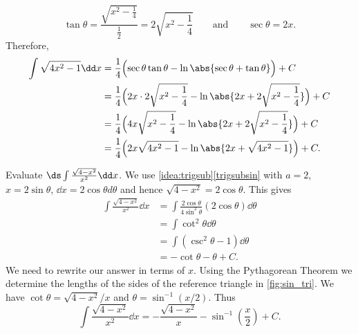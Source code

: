 \begin{example}
\[\tan \theta = \frac{\sqrt{x^2-\frac14}}{\frac12} = 2\sqrt{x^2-\frac14}\qquad \text{and}\qquad\sec\theta = 2x.\]
Therefore,
\begin{align*}
	\int \sqrt{4x^2-1}\dd x
	& =\frac14\Bigl(\sec\theta\tan\theta -\ln\abs{\sec\theta+\tan\theta}\Bigr)+C \\
	&=\frac14\Bigl(2x\cdot 2\sqrt{x^2-\frac14} - \ln\abs{2x + 2\sqrt{x^2-\frac14}}\Bigr)+C\\
	&= \frac14\Bigl(4x\sqrt{x^2-\frac14}-\ln\abs{2x + 2\sqrt{x^2-\frac14}}\Bigr)+C \\
	& = \frac14\Bigl(2x\sqrt{4x^2-1} - \ln\abs{2x + \sqrt{4x^2-1}}\Bigr)+C.
\end{align*}
\end{example}

\begin{example}\label{ex_trigsub4}
Evaluate $\ds \int \frac{\sqrt{4-x^2}}{x^2}\dd x$.
\solution
We use \autoref{idea:trigsub}\ref*{trigsubsin} with $a=2$, $x=2\sin \theta$, $\dd x = 2\cos \theta d\theta$ and hence $\sqrt{4-x^2} = 2\cos\theta$. This gives
\begin{align*}
\int \frac{\sqrt{4-x^2}}{x^2}\dd x &= \int \frac{2\cos\theta}{4\sin^2\theta}(2\cos\theta)\dd\theta\\
		&= \int \cot^2\theta\dd\theta\\
		&=	\int (\csc^2\theta -1)\dd\theta\\
		&= -\cot\theta -\theta + C.
\end{align*}
%
%
%
We need to rewrite our answer in terms of $x$. Using the Pythagorean Theorem we determine the lengths of the sides of the reference triangle in \autoref{fig:sin_tri}. We have $\cot\theta = \sqrt{4-x^2}/x$ and $\theta = \sin^{-1}(x/2)$. Thus
\[\int \frac{\sqrt{4-x^2}}{x^2}\dd x = -\frac{\sqrt{4-x^2}}x-\sin^{-1}\left(\frac x2\right) + C.\]
\end{example}

